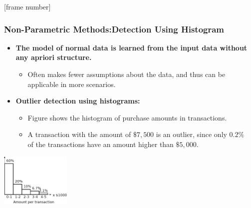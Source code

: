\documentclass[aspectratio=169,t,xcolor=dvipsnames]{beamer}
\begin{document}
{
  [frame number]
  \begin{frame}
  	\frametitle{Non-Parametric Methods:Detection Using Histogram}
  	\begin{itemize}
  		\item \textbf{The model of normal data is learned from the input data without any apriori structure.}
  		      \begin{itemize}
  		      	\item Often makes fewer assumptions about the data, and thus can be applicable in more scenarios.
  		      \end{itemize}
  		\item \textbf{Outlier detection using histograms:}
  		      \begin{itemize}
  		      	\item Figure shows the histogram of purchase amounts in transactions.
  		      	\item A transaction with the amount of $\$7,500$ is an outlier, since only $0.2\%$ \\ of the transactions have an amount higher than $\$5,000$.
  		      \end{itemize}
    	\end{itemize}
      \centering
      \vspace{0.2cm}
    	\includegraphics[width=0.25\textwidth]{img/histogram8.png}
  \end{frame}
}
\end{document}
